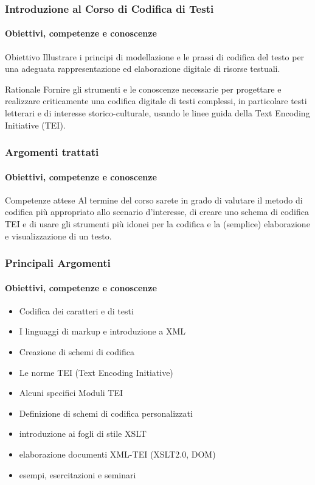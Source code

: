 
\begin{frame}
    \frametitle{Introduzione al Corso di Codifica di Testi}
    \framesubtitle{Obiettivi, competenze e conoscenze}
    \addtocounter{nframe}{1}
    
    \begin{block}{Obiettivo}
        Illustrare i principi di modellazione e le prassi di codifica del testo per una adeguata rappresentazione ed elaborazione digitale di risorse testuali.  
    \end{block}

    \begin{block}{Rationale}
       Fornire gli strumenti e le conoscenze necessarie per progettare e realizzare criticamente una codifica digitale di testi complessi, in particolare testi letterari e di interesse storico-culturale, usando le linee guida della Text Encoding Initiative (TEI).
    \end{block}

\end{frame}

\begin{frame}
    \frametitle{Argomenti trattati}
    \framesubtitle{Obiettivi, competenze e conoscenze}
    \addtocounter{nframe}{1}
    
    \begin{block}{Competenze attese}
        Al termine del corso sarete in grado di valutare il metodo di codifica più appropriato allo scenario d'interesse, di creare uno schema di codifica TEI e di usare gli strumenti più idonei per la codifica e la (semplice) elaborazione e visualizzazione di un testo.
    \end{block}

\end{frame}

\begin{frame}
    \frametitle{Principali Argomenti}
    \framesubtitle{Obiettivi, competenze e conoscenze}
    \addtocounter{nframe}{1}

    
        \begin{itemize}
            \item Codifica dei caratteri e di testi
            \item I linguaggi di markup e introduzione a XML
            \item Creazione di schemi di codifica
            \item Le norme TEI (Text Encoding Initiative)
            \item Alcuni specifici Moduli TEI
            \item Definizione di schemi di codifica personalizzati
            \item introduzione ai fogli di stile XSLT
            \item elaborazione documenti XML-TEI (XSLT2.0, DOM)
            \item esempi, esercitazioni e seminari 
        \end{itemize}

\end{frame}

